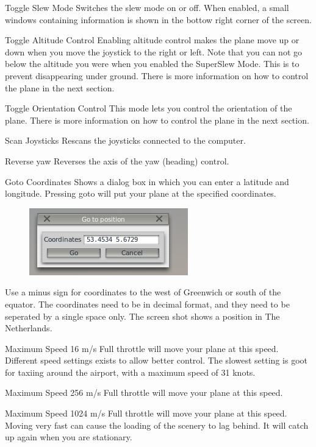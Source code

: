 \documentclass[a4paper,12pt]{article}
\newenvironment{vlist}[1]{%
\begin{list}{}{%
    \settowidth{\labelwidth}{\tt #1 }     %
    \setlength{\leftmargin}{\labelwidth}  %
    \addtolength{\leftmargin}{\labelsep}  %
    \setlength{\parsep}{0.5ex plus 0.2ex minus 0.2ex}
    \setlength{\itemsep}{0.3ex}
    \renewcommand{\makelabel}[1]{\color{headings}\tt ##1 \color{text1}\hfill}}}%
{\end{list}}
\begin{document}
\begin{vlist}{w}

\item[Toggle Slew Mode] Switches the slew mode on or
off. When enabled, a small windows containing information is shown in
the bottow right corner of the screen. 

\item[Toggle Altitude Control] Enabling altitude control makes the
  plane move up or down when you move the joystick to the right or
  left. Note that you can not go below the altitude you were when you
  enabled the SuperSlew Mode. This is to prevent disappearing under
  ground. There is more information on how to control the plane in the
  next section.

\item[Toggle Orientation Control] This mode lets you control the
  orientation of the plane. There is more information on how to
  control the plane in the next section.

\item[Scan Joysticks] Rescans the joysticks connected to the computer.

\item[Reverse yaw] Reverses the axis of the yaw (heading) control.

\item[Goto Coordinates] Shows a dialog box in which you can enter a
  latitude and longitude. Pressing goto will put your plane at the
  specified coordinates.
\begin{figure}[h!]%
\centering
\includegraphics[scale=1]{slewgoto.png}
\label{fig:slewgoto}
\end{figure}
Use a minus sign for coordinates to the west of Greenwich or south
of the equator. The coordinates need to be in decimal format, and they need
to be seperated by a single space only. The screen shot shows a
position in The Netherlands.

\item[Maximum Speed 16 m/s] Full throttle will move your plane at this
  speed. Different speed settings exists to allow better control. The
  slowest setting is goot for taxiing around the airport, with a
  maximum speed of 31 knots.

\item[Maximum Speed 256 m/s] Full throttle will move your plane at this
  speed. 

\item[Maximum Speed 1024 m/s] Full throttle will move your plane at this
  speed. Moving very fast can cause the loading of the scenery to lag
  behind. It will catch up again when you are stationary.

\end{vlist}{}
\end{document}
